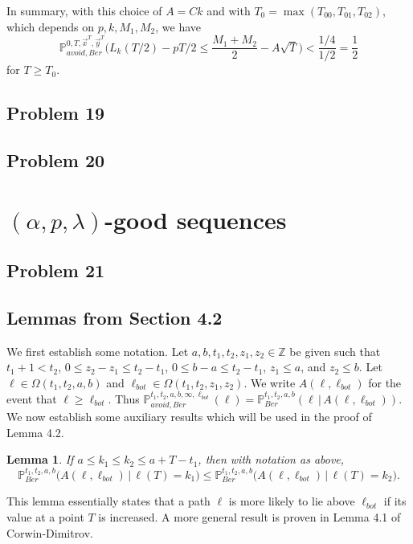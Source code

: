 \documentclass[12pt]{article}
\newtheorem{lemma}{Lemma}
\begin{document}
	In summary, with this choice of $A = Ck$ and with $T_0 = \max(T_{00}, T_{01}, T_{02})$, which depends on $p,k,M_1,M_2$, we have
	\[
	\mathbb{P}^{0,T,\vec{x}^T,\vec{y}^T}_{avoid, Ber} \Big( L_k(T/2) - pT/2 \leq \frac{M_1+M_2}{2} - A\sqrt{T} \Big) < \frac{1/4}{1/2} = \frac{1}{2}
	\]
	for $T\geq T_0$. 
	


\subsection*{Problem 19}


\subsection*{Problem 20}


\section{$(\alpha, p, \lambda)$-good sequences}

\subsection*{Problem 21}


\subsection*{Lemmas from Section 4.2}

	
	We first establish some notation. Let $a,b,t_1,t_2,z_1,z_2 \in \mathbb{Z}$ be given such that $t_1 + 1 < t_2$, $0\leq z_2 - z_1 \leq t_2 - t_1$, $0\leq b-a \leq t_2 - t_1$, $z_1\leq a$, and $z_2\leq b$. Let $\ell\in\Omega(t_1,t_2,a,b)$ and $\ell_{bot}\in\Omega(t_1,t_2,z_1,z_2)$. We write $A(\ell,\ell_{bot})$ for the event that $\ell \geq \ell_{bot}$. Thus $\mathbb{P}^{t_1,t_2,a,b,\infty,\ell_{bot}}_{avoid,Ber}(\ell) = \mathbb{P}^{t_1,t_2,a,b}_{Ber}(\ell\,|\,A(\ell,\ell_{bot}))$. We now establish some auxiliary results which will be used in the proof of Lemma 4.2.
	
	\begin{lemma}
		If $a\leq k_1\leq k_2\leq a + T - t_1$, then with notation as above,
		\[
		\mathbb{P}^{t_1, t_2, a, b}_{Ber}\big( A(\ell,\ell_{bot})\,\big|\,\ell(T) = k_1\big) \leq \mathbb{P}^{t_1, t_2, a, b}_{Ber}\big(A(\ell,\ell_{bot})\,\big|\,\ell(T) = k_2\big).
		\]
	\end{lemma}

	\begin{remark}
		This lemma essentially states that a path $\ell$ is more likely to lie above $\ell_{bot}$ if its value at a point $T$ is increased. A more general result is proven in Lemma 4.1 of Corwin-Dimitrov.
	\end{remark}
\end{document}
